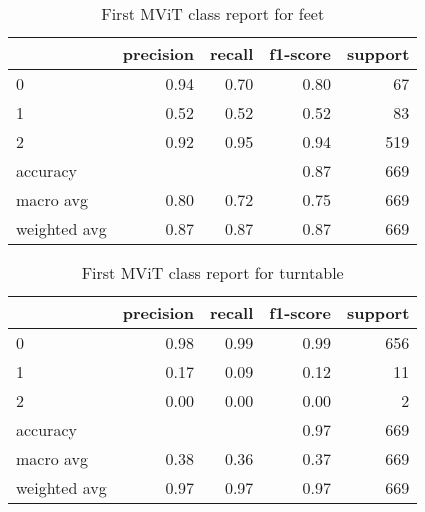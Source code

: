 \begin{table}[h!]
    \begin{tabular}{|l|r|r|r|r|}
                \hline & precision &   recall & f1-score &  support \\ \hline
                0 &      0.94 &      0.70 &      0.80 &        67 \\
                1 &      0.52 &      0.52 &      0.52 &        83 \\
                2 &      0.92 &      0.95 &      0.94 &       519 \\
         accuracy &           &           &      0.87 &       669 \\ \hline
        macro avg &      0.80 &      0.72 &      0.75 &       669 \\
     weighted avg &      0.87 &      0.87 &      0.87 &       669 \\
         \hline
    \end{tabular}
    \caption[Feet class report]{First MViT class report for feet}
    \label{tbl:mvit-first-class-reports-feet}
\end{table}

\begin{table}[h!]
    \begin{tabular}{|l|r|r|r|r|}
                \hline & precision &   recall & f1-score &  support \\ \hline
                0 &      0.98 &     0.99 &     0.99 &      656 \\
                1 &      0.17 &     0.09 &     0.12 &       11 \\
                2 &      0.00 &     0.00 &     0.00 &        2 \\ \hline
         accuracy &           &          &     0.97 &      669 \\
        macro avg &      0.38 &     0.36 &     0.37 &      669 \\
     weighted avg &      0.97 &     0.97 &     0.97 &      669 \\
         \hline
    \end{tabular}
    \caption[Turntable class report]{First MViT class report for turntable}
    \label{tbl:mvit-first-class-reports-turntable}
\end{table}

